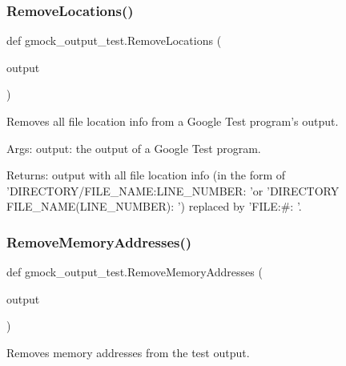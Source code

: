 \subsubsection{\texorpdfstring{Remove\+Locations()}{RemoveLocations()}}
{\footnotesize\ttfamily def gmock\+\_\+output\+\_\+test.\+Remove\+Locations (\begin{DoxyParamCaption}\item[{}]{output }\end{DoxyParamCaption})}

\begin{DoxyVerb}Removes all file location info from a Google Test program's output.

Args:
     output:  the output of a Google Test program.

Returns:
     output with all file location info (in the form of
     'DIRECTORY/FILE_NAME:LINE_NUMBER: 'or
     'DIRECTORY\\FILE_NAME(LINE_NUMBER): ') replaced by
     'FILE:#: '.
\end{DoxyVerb}
 \mbox{\label{namespacegmock__output__test_a58b4fdb82b40d01d32b09d4c14ba11a5}} 
\subsubsection{\texorpdfstring{Remove\+Memory\+Addresses()}{RemoveMemoryAddresses()}}
{\footnotesize\ttfamily def gmock\+\_\+output\+\_\+test.\+Remove\+Memory\+Addresses (\begin{DoxyParamCaption}\item[{}]{output }\end{DoxyParamCaption})}

\begin{DoxyVerb}Removes memory addresses from the test output.\end{DoxyVerb}
 \mbox{\label{namespacegmock__output__test_a2ebfc0abfb0ed307021ecaa9da465c55}} 
